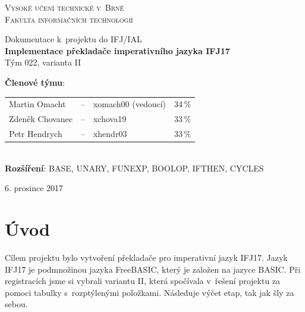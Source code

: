 \documentclass[a4paper,11pt,leqno]{article}
\begin{document}
\begin{titlepage}
	\begin{center}
		{\Huge                
		\textsc{Vysoké učení technické v~Brně}}		\\[1em]
		{\huge
		\textsc{Fakulta informačních technologií}}  \\

		\begin{figure}[h]
			\begin{center}
			\end{center}
		\end{figure}
	
		{\LARGE
		Dokumentace k~projektu do IFJ/IAL}	\\[3ex]
		{\Huge\textbf{Implementace překladače imperativního jazyka IFJ17}}	\\[1.5ex]
		{\Huge Tým 022, varianta II}	\\
	\end{center}
		{\Large
	\textbf{Členové týmu}:	\\
		\begin{tabular}{lclc}
Martin Omacht  	& -- & xomach00 (vedoucí) 	& 34\,\%	\\
Zdeněk Chovanec & -- & xchova19				& 33\,\%	\\
Petr Hendrych 	& -- & xhendr03 			& 33\,\%
		\end{tabular}} \\[3ex]
		{\Large \textbf{Rozšíření}: BASE, UNARY, FUNEXP, BOOLOP, IFTHEN, CYCLES} \\[3ex]
		\begin{flushright}
			{\Large 6. prosince 2017}
		\end{flushright}
\end{titlepage}
\section{Úvod}
Cílem projektu bylo vytvoření překladače pro imperativní jazyk IFJ17.
Jazyk IFJ17 je podmnožinou jazyka FreeBASIC, který je založen na jazyce BASIC.
Při registracích jsme si vybrali variantu II, která spočívala v řešení projektu za pomoci tabulky s~rozptýlenými položkami.
Následuje výčet etap, tak jak šly za sebou.
\end{document}
